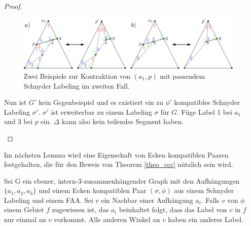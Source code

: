 \begin{proof}
\begin{description}
\begin{figure}[h]
	\centering
	  \includegraphics[width=1\textwidth]{lem3_2.png}
    	\caption{Zwei Beispiele zur Kontraktion von $(a_1,p)$ mit passendem Schnyder Labeling im zweiten Fall.}
    	\label{pic_lem3_2}
\end{figure}

Nun ist $G'$ kein Gegenbeispiel und es existiert ein zu $\phi'$ kompatibles Schnyder Labeling $\sigma'$. $\sigma'$ ist erweiterbar zu einem Labeling $\sigma$ für $G$. Füge Label 1 bei $a_1$ und 3 bei $p$ ein. $\Delta$ kann also kein teilendes Segment haben.
\end{description}
\end{proof}

Im nächsten Lemma wird eine Eigenschaft von Ecken kompatiblen Paaren festgehalten, die für den Beweis von Theorem \ref{theo_ccc} nützlich sein wird.

\begin{lemma}\label{lem4}
Sei G ein ebener, intern-3-zusammenhängender Graph mit den Aufhängungen $\{a_1,a_2,a_3\}$ und einem Ecken kompatiblen Paar $(\sigma,\phi)$ aus einem Schnyder Labeling und einem FAA. Sei $v$ ein Nachbar einer Aufhängung $a_i$. Falls $v$ von $\phi$ einem Gebiet $f$ zugewiesen ist, das $a_i$ beinhaltet folgt, dass das Label von $v$ in $f$ nur einmal an $v$ vorkommt. Alle anderen Winkel an $v$ haben ein anderes Label.
\end{lemma}

